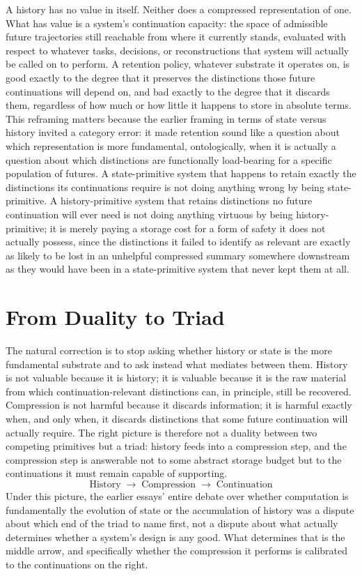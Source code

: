 \documentclass[11pt]{article}
\begin{document}
A history has no value in itself. Neither does a compressed representation of one. What has value is a system's continuation capacity: the space of admissible future trajectories still reachable from where it currently stands, evaluated with respect to whatever tasks, decisions, or reconstructions that system will actually be called on to perform. A retention policy, whatever substrate it operates on, is good exactly to the degree that it preserves the distinctions those future continuations will depend on, and bad exactly to the degree that it discards them, regardless of how much or how little it happens to store in absolute terms. This reframing matters because the earlier framing in terms of state versus history invited a category error: it made retention sound like a question about which representation is more fundamental, ontologically, when it is actually a question about which distinctions are functionally load-bearing for a specific population of futures. A state-primitive system that happens to retain exactly the distinctions its continuations require is not doing anything wrong by being state-primitive. A history-primitive system that retains distinctions no future continuation will ever need is not doing anything virtuous by being history-primitive; it is merely paying a storage cost for a form of safety it does not actually possess, since the distinctions it failed to identify as relevant are exactly as likely to be lost in an unhelpful compressed summary somewhere downstream as they would have been in a state-primitive system that never kept them at all.

\section{From Duality to Triad}

The natural correction is to stop asking whether history or state is the more fundamental substrate and to ask instead what mediates between them. History is not valuable because it is history; it is valuable because it is the raw material from which continuation-relevant distinctions can, in principle, still be recovered. Compression is not harmful because it discards information; it is harmful exactly when, and only when, it discards distinctions that some future continuation will actually require. The right picture is therefore not a duality between two competing primitives but a triad: history feeds into a compression step, and the compression step is answerable not to some abstract storage budget but to the continuations it must remain capable of supporting.
\[
\text{History} \;\longrightarrow\; \text{Compression} \;\longrightarrow\; \text{Continuation}
\]
Under this picture, the earlier essays' entire debate over whether computation is fundamentally the evolution of state or the accumulation of history was a dispute about which end of the triad to name first, not a dispute about what actually determines whether a system's design is any good. What determines that is the middle arrow, and specifically whether the compression it performs is calibrated to the continuations on the right.
\end{document}
